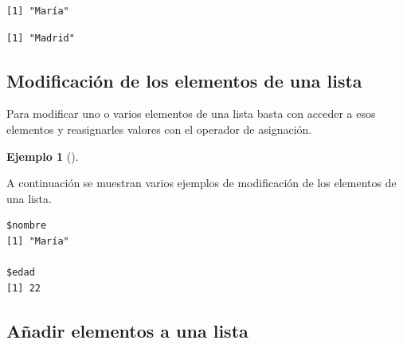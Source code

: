\documentclass[
  a4paper,
]{scrreport}
\newenvironment{Shaded}{\begin{snugshade}}{\end{snugshade}}
\newcommand{\CommentTok}[1]{\textcolor[rgb]{0.37,0.37,0.37}{#1}}
\newcommand{\DecValTok}[1]{\textcolor[rgb]{0.68,0.00,0.00}{#1}}
\newcommand{\FunctionTok}[1]{\textcolor[rgb]{0.28,0.35,0.67}{#1}}
\newcommand{\NormalTok}[1]{\textcolor[rgb]{0.00,0.23,0.31}{#1}}
\newcommand{\OtherTok}[1]{\textcolor[rgb]{0.00,0.23,0.31}{#1}}
\newcommand{\SpecialCharTok}[1]{\textcolor[rgb]{0.37,0.37,0.37}{#1}}
\newcommand{\StringTok}[1]{\textcolor[rgb]{0.13,0.47,0.30}{#1}}
\theoremstyle{definition}
\newtheorem{example}{Ejemplo}[chapter]
\theoremstyle{definition}
\theoremstyle{remark}
\begin{document}
\begin{verbatim}
[1] "María"
\end{verbatim}

\begin{Shaded}
\end{Shaded}

\begin{verbatim}
[1] "Madrid"
\end{verbatim}

\hypertarget{modificaciuxf3n-de-los-elementos-de-una-lista}{%
\subsection{Modificación de los elementos de una
lista}\label{modificaciuxf3n-de-los-elementos-de-una-lista}}

Para modificar uno o varios elementos de una lista basta con acceder a
esos elementos y reasignarles valores con el operador de asignación.

\leavevmode{}%
\begin{example}[]\label{exm-modificacion-listas}

A continuación se muestran varios ejemplos de modificación de los
elementos de una lista.

\begin{Shaded}
\end{Shaded}

\begin{verbatim}
$nombre
[1] "María"

$edad
[1] 22
\end{verbatim}

\end{example}

\hypertarget{auxf1adir-elementos-a-una-lista}{%
\subsection{Añadir elementos a una
lista}\label{auxf1adir-elementos-a-una-lista}}
\end{document}
